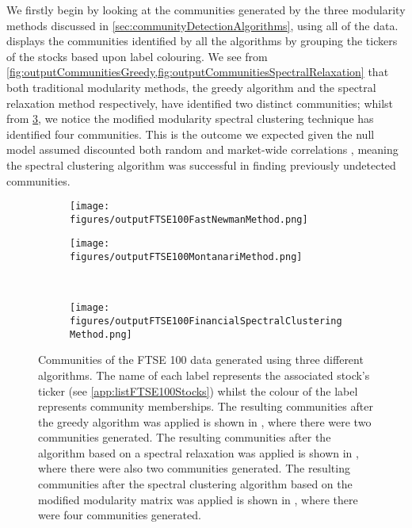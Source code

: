 We firstly begin by looking at the communities generated by the three modularity methods discussed in \cref{sec:communityDetectionAlgorithms}, using all of the data.
 displays the communities identified by all the algorithms by grouping the tickers of the stocks based upon label colouring.
We see from \cref{fig:outputCommunitiesGreedy,fig:outputCommunitiesSpectralRelaxation} that both traditional modularity methods, the greedy algorithm and the spectral relaxation method respectively, have identified two distinct communities; whilst from \cref{fig:outputCommunitiesSpectralClustering}, we notice the modified modularity spectral clustering technique has identified four communities.
This is the outcome we expected given the null model assumed discounted both random and market-wide correlations \cite{MG13}, meaning the spectral clustering algorithm was successful in finding previously undetected communities.

\begin{figure}
\centering
	\begin{subfigure}{.5\textwidth}
		\centering
		\texttt{[image: figures/outputFTSE100FastNewmanMethod.png]}
		\caption{}
		\label{fig:outputCommunitiesGreedy}
	\end{subfigure}%
	\begin{subfigure}{.5\textwidth}
		\centering
		\texttt{[image: figures/outputFTSE100MontanariMethod.png]}
		\caption{}
		\label{fig:outputCommunitiesSpectralRelaxation}
	\end{subfigure}\\
	\begin{subfigure}{.5\textwidth}
		\centering
		\texttt{[image: figures/outputFTSE100FinancialSpectralClusteringMethod.png]}
		\caption{}
		\label{fig:outputCommunitiesSpectralClustering}
	\end{subfigure}
	\caption[Communities of the FTSE 100 data generated using three different algorithms.]{\label{fig:outputFTSE100} Communities of the FTSE 100 data generated using three different algorithms. The name of each label represents the associated stock's ticker (see \cref{app:listFTSE100Stocks}) whilst the colour of the label represents community memberships. The resulting communities after the greedy algorithm was applied is shown in , where there were two communities generated. The resulting communities after the algorithm based on a spectral relaxation was applied is shown in , where there were also two communities generated. The resulting communities after the spectral clustering algorithm based on the modified modularity matrix was applied is shown in , where there were four communities generated.}
\end{figure}

